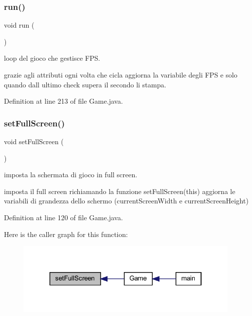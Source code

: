 \subsubsection{\texorpdfstring{run()}{run()}}
{\footnotesize\ttfamily void run (\begin{DoxyParamCaption}{ }\end{DoxyParamCaption})}



loop del gioco che gestisce F\+PS. 

grazie agli attributi ogni volta che cicla aggiorna la variabile degli F\+PS e solo quando dall ultimo check supera il secondo li stampa. 

Definition at line 213 of file Game.\+java.

\mbox{\label{classprogetto_1_1_game_a7ac5b05774724411897684758dec30f9}} 
\subsubsection{\texorpdfstring{set\+Full\+Screen()}{setFullScreen()}}
{\footnotesize\ttfamily void set\+Full\+Screen (\begin{DoxyParamCaption}{ }\end{DoxyParamCaption})}



imposta la schermata di gioco in full screen. 

imposta il full screen richiamando la funzione set\+Full\+Screen(this) aggiorna le variabili di grandezza dello schermo (current\+Screen\+Width e current\+Screen\+Height) 

Definition at line 120 of file Game.\+java.

Here is the caller graph for this function\+:\nopagebreak
\begin{figure}[H]
\begin{center}
\leavevmode
\includegraphics[width=310pt]{classprogetto_1_1_game_a7ac5b05774724411897684758dec30f9_icgraph}
\end{center}
\end{figure}
\mbox{\label{classprogetto_1_1_game_ab1f321a2f17fa8ba0f5ab4e2621fd6d6}} 

